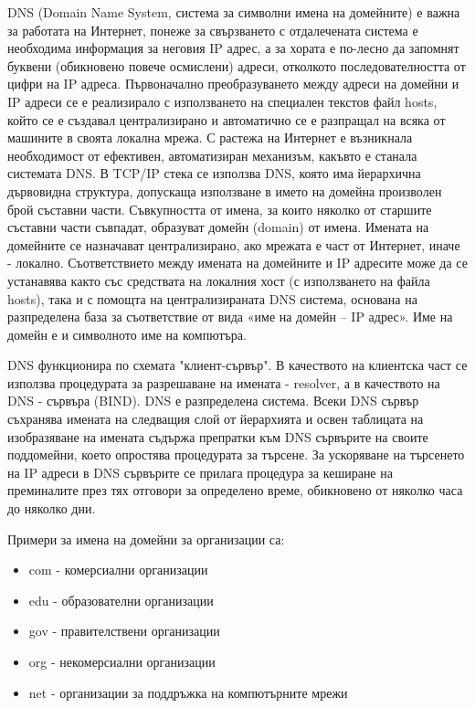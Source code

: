 \documentclass{article}
\begin{document}
DNS (Domain Name System, система за символни имена на домейните) е важна за работата на Интернет, понеже за свързването с
отдалечената система е необходима информация за неговия IP адрес, а за хората е по-лесно да запомнят буквени (обикновено
повече осмислени) адреси, отколкото последователността от цифри на IP адреса. Първоначално преобразуването между адреси на
домейни и IP адреси се е реализирало с използването на специален текстов файл hosts, който се е създавал централизирано и
автоматично се е разпращал на всяка от машините в своята локална мрежа. С растежа на Интернет е възникнала необходимост от
ефективен, автоматизиран механизъм, какъвто е станала системата DNS. 
В TCP/IP стека се използва DNS, която има йерархична дървовидна структура, допускаща използване в името на домейна произволен
брой съставни части. Съвкупността от имена, за които няколко от старшите съставни части съвпадат, образуват домейн (domain) от
имена. Имената на домейните се назначават централизирано, ако мрежата е част от Интернет, иначе - локално.
Съответствието между имената на домейните и IP адресите може да се устанавява както със средствата на локалния хост
(с използването на файла hosts), така и с помощта на централизираната DNS система, основана на разпределена база за съответствие
от вида «име на домейн – IP адрес». Име на домейн е и символното име на компютъра.

DNS функционира по схемата "клиент-сървър". В качеството на клиентска част се използва процедурата за разрешаване на имената -
resolver, а в качеството на DNS - сървъра (BIND). DNS е разпределена система. Всеки DNS сървър съхранява имената на следващия
слой от йерархията и освен таблицата на изобразяване на имената съдържа препратки към DNS сървърите на своите поддомейни, което
опростява процедурата за търсене. За ускоряване на търсенето на IP адреси в DNS сървърите се прилага процедура за кеширане на
преминалите през тях отговори за определено време, обикновено от няколко часа до няколко дни.

Примери за имена на домейни за организации са:
\begin{itemize}
    \item com - комерсиални организации
    \item edu - образователни организации
    \item gov - правителствени организации
    \item org - некомерсиални организации
    \item net - организации за поддръжка на компютърните мрежи
\end{itemize}
\end{document}
